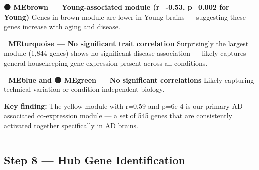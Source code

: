 \documentclass[
]{article}
\begin{document}
\textbf{🟤 MEbrown --- Young-associated module (r=-0.53, p=0.002 for
Young)} Genes in brown module are lower in Young brains --- suggesting
these genes increase with aging and disease.

\textbf{🩵 MEturquoise --- No significant trait correlation}
Surprisingly the largest module (1,844 genes) shows no significant
disease association --- likely captures general housekeeping gene
expression present across all conditions.

\textbf{🔵 MEblue and 🟢 MEgreen --- No significant correlations} Likely
capturing technical variation or condition-independent biology.

\textbf{Key finding:} The yellow module with r=0.59 and p=6e-4 is our
primary AD-associated co-expression module --- a set of 545 genes that
are consistently activated together specifically in AD brains.

\begin{center}\rule{0.5\linewidth}{0.5pt}\end{center}

\subsection{Step 8 --- Hub Gene
Identification}\label{step-8-hub-gene-identification}
\end{document}
